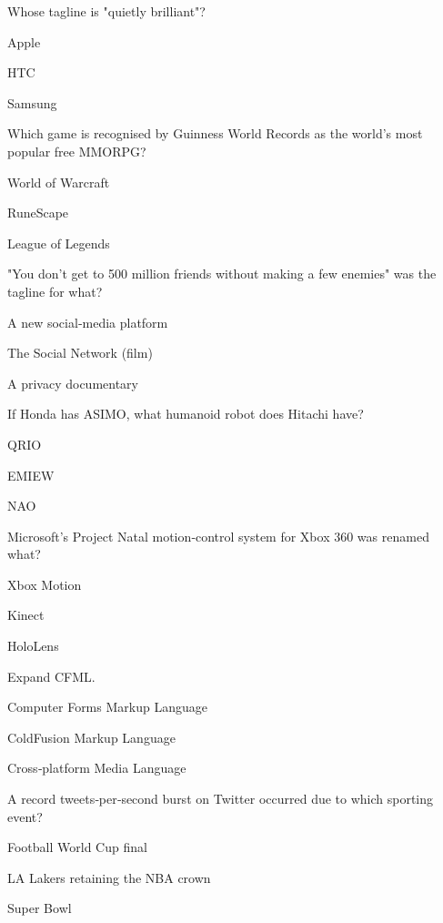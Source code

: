 \begin{enhancedmcq}{Whose tagline is "quietly brilliant"?}
\item Apple
\item HTC
\item Samsung

\end{enhancedmcq}
\begin{enhancedmcq}{Which game is recognised by Guinness World Records as the world's most popular free MMORPG?}
\item World of Warcraft
\item RuneScape
\item League of Legends

\end{enhancedmcq}
\begin{enhancedmcq}{"You don't get to 500 million friends without making a few enemies" was the tagline for what?}
\item A new social‑media platform
\item The Social Network (film)
\item A privacy documentary

\end{enhancedmcq}
\begin{enhancedmcq}{If Honda has ASIMO, what humanoid robot does Hitachi have?}
\item QRIO
\item EMIEW
\item NAO

\end{enhancedmcq}
\begin{enhancedmcq}{Microsoft's Project Natal motion‑control system for Xbox 360 was renamed what?}
\item Xbox Motion
\item Kinect
\item HoloLens

\end{enhancedmcq}
\begin{enhancedmcq}{Expand CFML.}
\item Computer Forms Markup Language
\item ColdFusion Markup Language
\item Cross‑platform Media Language

\end{enhancedmcq}
\begin{enhancedmcq}{A record tweets‑per‑second burst on Twitter occurred due to which sporting event?}
\item Football World Cup final
\item LA Lakers retaining the NBA crown
\item Super Bowl

\end{enhancedmcq}
